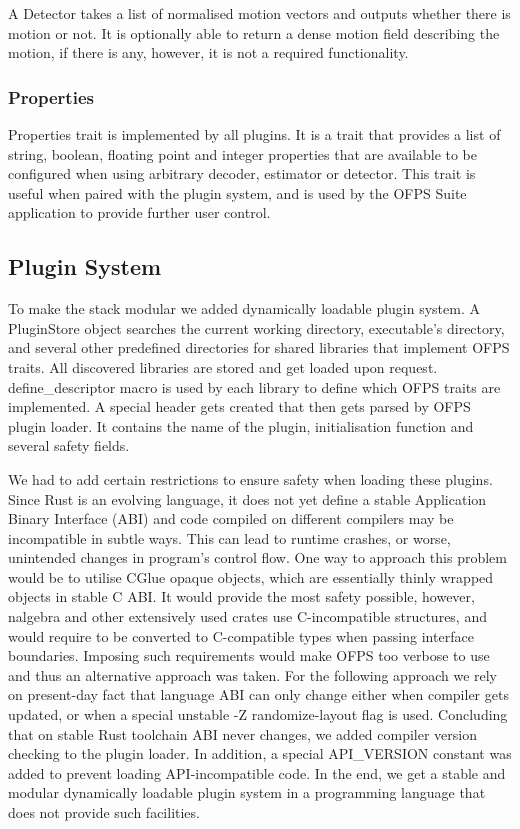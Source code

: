 \documentclass[11pt,english]{report}
\begin{document}
A Detector takes a list of normalised motion vectors and outputs whether there is motion or not. It is optionally able to return a dense motion field describing the motion, if there is any, however, it is not a required functionality.

\subsubsection{Properties}

Properties trait is implemented by all plugins. It is a trait that provides a list of string, boolean, floating point and integer properties that are available to be configured when using arbitrary decoder, estimator or detector. This trait is useful when paired with the plugin system, and is used by the OFPS Suite application to provide further user control.

\subsection{Plugin System}

To make the stack modular we added dynamically loadable plugin system. A PluginStore object searches the current working directory, executable's directory, and several other predefined directories for shared libraries that implement OFPS traits. All discovered libraries are stored and get loaded upon request. define\_descriptor macro is used by each library to define which OFPS traits are implemented. A special header gets created that then gets parsed by OFPS plugin loader. It contains the name of the plugin, initialisation function and several safety fields.

We had to add certain restrictions to ensure safety when loading these plugins. Since Rust is an evolving language, it does not yet define a stable Application Binary Interface (ABI)\cite{abi-ip} and code compiled on different compilers may be incompatible in subtle ways. This can lead to runtime crashes, or worse, unintended changes in program's control flow. One way to approach this problem would be to utilise CGlue opaque objects\cite{cglue}, which are essentially thinly wrapped objects in stable C ABI. It would provide the most safety possible, however, nalgebra and other extensively used crates use C-incompatible structures, and would require to be converted to C-compatible types when passing interface boundaries. Imposing such requirements would make OFPS too verbose to use and thus an alternative approach was taken. For the following approach we rely on present-day fact that language ABI can only change either when compiler gets updated, or when a special unstable -Z randomize-layout\cite{randomize-layout} flag is used. Concluding that on stable Rust toolchain ABI never changes, we added compiler version checking to the plugin loader. In addition, a special API\_VERSION constant was added to prevent loading API-incompatible code. In the end, we get a stable and modular dynamically loadable plugin system in a programming language that does not provide such facilities.
\end{document}
